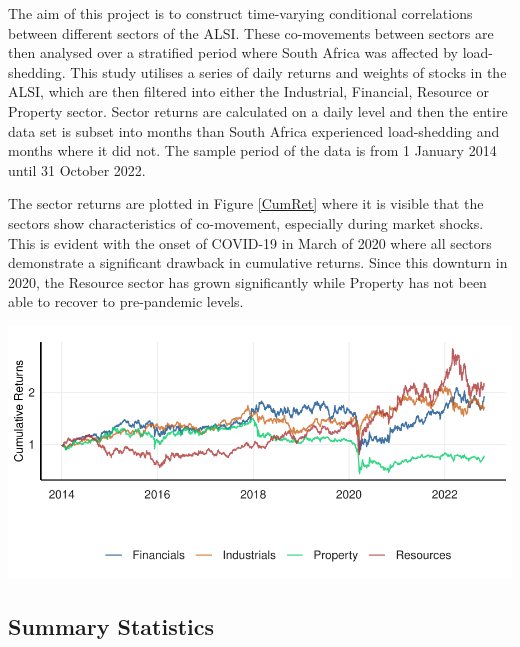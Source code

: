 \documentclass[11pt,preprint, authoryear]{elsarticle}
\let\origfigure\figure
\let\endorigfigure\endfigure
\renewenvironment{figure}[1][2] {
    \expandafter\origfigure\expandafter[H]
} {
    \endorigfigure
}
\numberwithin{equation}{section}
\numberwithin{figure}{section}
\numberwithin{table}{section}
\begin{document}
The aim of this project is to construct time-varying conditional
correlations between different sectors of the ALSI. These co-movements
between sectors are then analysed over a stratified period where South
Africa was affected by load-shedding. This study utilises a series of
daily returns and weights of stocks in the ALSI, which are then filtered
into either the Industrial, Financial, Resource or Property sector.
Sector returns are calculated on a daily level and then the entire data
set is subset into months than South Africa experienced load-shedding
and months where it did not. The sample period of the data is from 1
January 2014 until 31 October 2022.

The sector returns are plotted in Figure \ref{CumRet} where it is
visible that the sectors show characteristics of co-movement, especially
during market shocks. This is evident with the onset of COVID-19 in
March of 2020 where all sectors demonstrate a significant drawback in
cumulative returns. Since this downturn in 2020, the Resource sector has
grown significantly while Property has not been able to recover to
pre-pandemic levels.

\begin{figure}[H]

{\centering \includegraphics{Paper_files/figure-latex/CumRet-1} 

}

\caption{Cumulative Returns per Sector for ALSI and SWIX \label{CumRet}}\label{fig:CumRet}
\end{figure}

\hypertarget{summary-statistics}{%
\subsection{Summary Statistics}\label{summary-statistics}}
\end{document}
